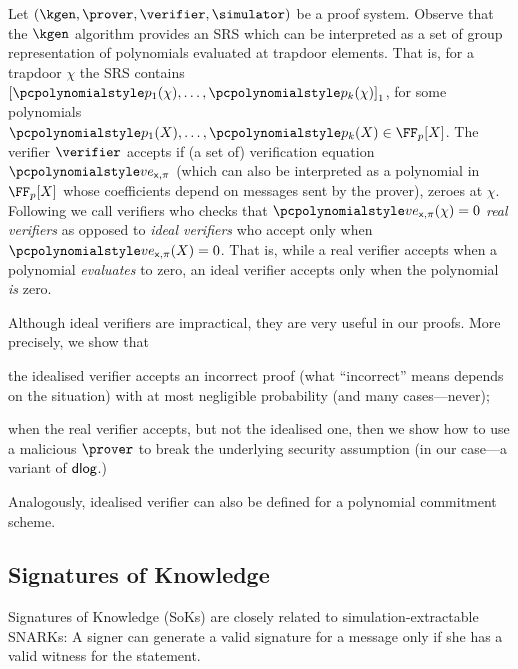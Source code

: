  Let
$(\kgen, \prover, \verifier, \simulator)$ be a proof system.
Observe that the $\kgen$ algorithm provides an SRS which can be interpreted as a
set of group representation of polynomials evaluated at trapdoor
elements. That is, for a trapdoor $\chi$ the SRS contains
$\gone{\p{p_1}(\chi), \ldots, \p{p_k}(\chi)}$, for some polynomials
$\p{p_1}(X), \ldots, \p{p_k}(X) \in \FF_p[X]$. The verifier
$\verifier$ accepts if (a set of) verification equation
$\vereq_{\inp, \zkproof}$ %
(which can also be interpreted as a
polynomial in $\FF_p[X]$ whose coefficients depend on messages sent by the
prover), zeroes at $\chi$. Following \cite{EPRINT:GabWilCio19} we call verifiers
who checks that $\vereq_{\inp, \zkproof}(\chi) = 0$ \emph{real verifiers} as
opposed to \emph{ideal verifiers} who accept only when
$\vereq_{\inp, \zkproof}(X) = 0$. That is, while a real verifier accepts when a
polynomial \emph{evaluates} to zero, an ideal verifier accepts only when the
polynomial \emph{is} zero.

Although ideal verifiers are impractical, they are very useful in our
proofs. More precisely, we show that
\begin{compactenum}
\item the idealised verifier accepts an incorrect proof (what ``incorrect''
  means depends on the situation) with at most negligible probability (and many
  cases---never);
\item when the real verifier accepts, but not the idealised one, then we show
  how to use a malicious $\prover$ to break the underlying security assumption
  (in our case---a variant of $\mathsf{dlog}$.)
\end{compactenum}

Analogously, idealised verifier can also be defined for a polynomial commitment scheme.

 
\subsection{Signatures of Knowledge}
Signatures of Knowledge (SoKs) \cite{C:ChaLys06} are closely related to simulation-extractable SNARKs: A signer can generate a valid signature for a message only if she has a valid witness for the statement. 

